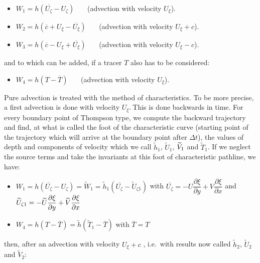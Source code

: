\begin{itemize}
\item $W_{1}=h(\overline{U_{\zeta }}-U_{\zeta })$ \ \ \ (advection with
velocity $U_{\xi }$).

\item $W_{2}=h(\overline{c}+U_{\xi }-\overline{U_{\xi }})$ \ \ \
(advection with velocity $U_{\xi }+c$).

\item $W_{3}=h(\overline{c}-U_{\xi }+\overline{U_{\xi }})$ \ \ \
(advection with velocity $U_{\xi }-c$).
\end{itemize}

\noindent and to which can be added, if a tracer $T$ also has to be
considered:

\begin{itemize}
\item $W_{4}=h(T-\overline{T})$ \ \ \ (advection with velocity $U_{\xi }$).
\end{itemize}

Pure advection is treated with the method of characteristics. To be more
precise, a first advection is done with velocity $U_{\xi }.\ $This is done
backwards in time. For every boundary point of Thompson type, we compute the
backward trajectory and find, at what is called the foot of the
characteristic curve (starting point of the trajectory which will arrive at
the boundary point after $\Delta t$), the values of depth and components of
velocity which we call $\widetilde{h}_{1}$, $\widetilde{U}_{1}$, $\widetilde{%
V}_{1}$ and $\widetilde{T}_{1}$. If we neglect the source terms and take the
invariants at this foot of characteristic pathline, we have:

\begin{itemize}
\item $W_{1}=h(\overline{U_{\zeta }}-U_{\zeta })=\widetilde{W}_{1}=%
\widetilde{h}_{1}(\overline{U_{\zeta }}-\widetilde{U}_{\zeta 1})$ with $%
\overline{U_{\zeta }}=-U\dfrac{\partial \xi }{\partial y}+V\dfrac{\partial
\xi }{\partial x}$ and $\widetilde{U}_{\zeta 1}=-\widetilde{U}\dfrac{%
\partial \xi }{\partial y}+\widetilde{V}\dfrac{\partial \xi }{\partial x}$

\item $W_{4}=h(T-\overline{T})=\widetilde{h}(\widetilde{T}_{1}-\overline{T}) 
$ with $\overline{T}=T$
\end{itemize}

then, after an advection with velocity $U_{\xi }+c$ , i.e.\ with results
now called $\widetilde{h}_{2}$, $\widetilde{U}_{2}$ and $\widetilde{V}_{2}$:

